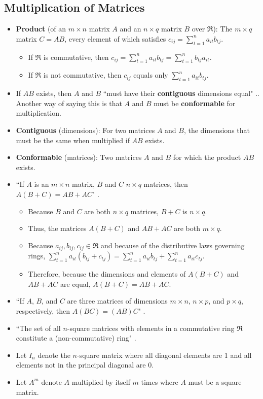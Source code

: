\documentclass[titlepage]{article}
\numberwithin{figure}{section}
\numberwithin{equation}{section}
\newcommand{\dq}[4][]{``#2"#1 \cite[#4]{#3}.}
\begin{document}
\subsection{Multiplication of Matrices}
\begin{itemize}
    \item \textbf{Product} (of an $m\times n$ matrix $A$ and an $n\times q$ matrix $B$ over $\mathfrak{R}$): The $m\times q$ matrix $C=AB$, every element of which satisfies $c_{ij}=\sum_{t=1}^n a_{it}b_{tj}$.
    \begin{itemize}
        \item If $\mathfrak{R}$ is commutative, then $c_{ij}=\sum_{t=1}^n a_{it}b_{tj}=\sum_{t=1}^n b_{tj}a_{it}$.
        \item If $\mathfrak{R}$ is not commutative, then $c_{ij}$ equals only $\sum_{t=1}^n a_{it}b_{tj}$.
    \end{itemize}
    \item If $AB$ exists, then $A$ and $B$ \dq{must have their \textbf{contiguous} dimensions equal}{bib:determinants}{6}. Another way of saying this is that $A$ and $B$ must be \textbf{conformable} for multiplication.
    \item \textbf{Contiguous} (dimensions): For two matrices $A$ and $B$, the dimensions that must be the same when multiplied if $AB$ exists.
    \item \textbf{Conformable} (matrices): Two matrices $A$ and $B$ for which the product $AB$ exists.
    \item \dq{If $A$ is an $m\times n$ matrix, $B$ and $C$ $n\times q$ matrices, then $A(B+C)=AB+AC$}{bib:determinants}{7}
    \begin{itemize}
        \item Because $B$ and $C$ are both $n\times q$ matrices, $B+C$ is $n\times q$.
        \item Thus, the matrices $A(B+C)$ and $AB+AC$ are both $m\times q$.
        \item Because $a_{ij},b_{ij},c_{ij}\in\mathfrak{R}$ and because of the distributive laws governing rings, $\sum_{t=1}^n a_{it}(b_{tj}+c_{tj}) = \sum_{t=1}^na_{it}b_{tj}+\sum_{t=1}^na_{it}c_{tj}$.
        \item Therefore, because the dimensions and elements of $A(B+C)$ and $AB+AC$ are equal, $A(B+C)=AB+AC$.
    \end{itemize}
    \item \dq{If $A$, $B$, and $C$ are three matrices of dimensions $m\times n$, $n\times p$, and $p\times q$, respectively, then $A(BC)=(AB)C$}{bib:determinants}{7}
    \item \dq{The set of all $n$-square matrices with elements in a commutative ring $\mathfrak{R}$ constitute a (non-commutative) ring}{bib:determinants}{8}
    \item Let $I_n$ denote the $n$-square matrix where all diagonal elements are 1 and all elements not in the principal diagonal are 0.
    \item Let $A^m$ denote $A$ multiplied by itself $m$ times where $A$ must be a square matrix.
\end{itemize}
\end{document}

